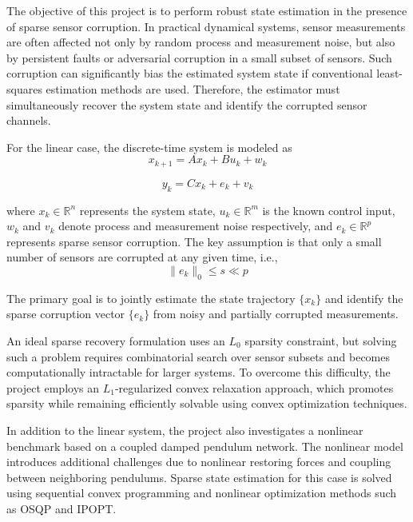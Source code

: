 \documentclass[conference]{IEEEtran}
\begin{document}
The objective of this project is to perform robust state estimation in the presence of sparse sensor corruption. In practical dynamical systems, sensor measurements are often affected not only by random process and measurement noise, but also by persistent faults or adversarial corruption in a small subset of sensors. Such corruption can significantly bias the estimated system state if conventional least-squares estimation methods are used. Therefore, the estimator must simultaneously recover the system state and identify the corrupted sensor channels.

For the linear case, the discrete-time system is modeled as
\begin{equation}
x_{k+1} = Ax_k + Bu_k + w_k
\end{equation}

\begin{equation}
y_k = Cx_k + e_k + v_k
\end{equation}

where $x_k \in \mathbb{R}^n$ represents the system state, $u_k \in \mathbb{R}^m$ is the known control input, $w_k$ and $v_k$ denote process and measurement noise respectively, and $e_k \in \mathbb{R}^p$ represents sparse sensor corruption. The key assumption is that only a small number of sensors are corrupted at any given time, i.e.,
\begin{equation}
\|e_k\|_0 \leq s \ll p
\end{equation}

The primary goal is to jointly estimate the state trajectory $\{x_k\}$ and identify the sparse corruption vector $\{e_k\}$ from noisy and partially corrupted measurements.

An ideal sparse recovery formulation uses an $L_0$ sparsity constraint, but solving such a problem requires combinatorial search over sensor subsets and becomes computationally intractable for larger systems. To overcome this difficulty, the project employs an $L_1$-regularized convex relaxation approach, which promotes sparsity while remaining efficiently solvable using convex optimization techniques.

In addition to the linear system, the project also investigates a nonlinear benchmark based on a coupled damped pendulum network. The nonlinear model introduces additional challenges due to nonlinear restoring forces and coupling between neighboring pendulums. Sparse state estimation for this case is solved using sequential convex programming and nonlinear optimization methods such as OSQP and IPOPT.
\end{document}
